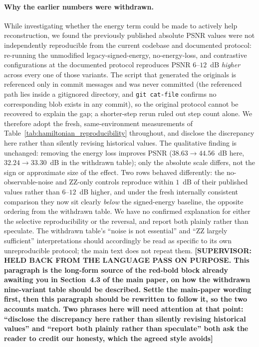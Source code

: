 \documentclass[11pt]{article}
\begin{document}
\paragraph{Why the earlier numbers were withdrawn.}\label{sec:hamiltonian_followup} While investigating whether the energy term could be made to actively help reconstruction, we found the previously published absolute PSNR values were not independently reproducible from the current codebase and documented protocol: re-running the unmodified legacy-signed-energy, no-energy-loss, and contrastive configurations at the documented protocol reproduces PSNR $6$--$12$~dB \emph{higher} across every one of those variants. The script that generated the originals is referenced only in commit messages and was never committed (the referenced path lies inside a gitignored directory, and \texttt{git cat-file} confirms no corresponding blob exists in any commit), so the original protocol cannot be recovered to explain the gap; a shorter-step rerun ruled out step count alone. We therefore adopt the fresh, same-environment measurements of Table~\ref{tab:hamiltonian_reproducibility} throughout, and disclose the discrepancy here rather than silently revising historical values. The qualitative finding is unchanged: removing the energy loss improves PSNR ($38.63\rightarrow44.56$~dB here, $32.24\rightarrow33.30$~dB in the withdrawn table); only the absolute scale differs, not the sign or approximate size of the effect. Two rows behaved differently: the no-observable-noise and ZZ-only controls reproduce within $1$~dB of their published values rather than $6$--$12$~dB higher, and under the fresh internally consistent comparison they now sit clearly \emph{below} the signed-energy baseline, the opposite ordering from the withdrawn table. We have no confirmed explanation for either the selective reproducibility or the reversal, and report both plainly rather than speculate. The withdrawn table's ``noise is not essential'' and ``ZZ largely sufficient'' interpretations should accordingly be read as specific to its own unreproducible protocol; the main text does not repeat them. {\color{red}\textbf{[SUPERVISOR: HELD BACK FROM THE LANGUAGE PASS ON PURPOSE. This paragraph is the long-form source of the red-bold block already awaiting you in Section~4.3 of the main paper, on how the withdrawn nine-variant table should be described. Settle the main-paper wording first, then this paragraph should be rewritten to follow it, so the two accounts match. Two phrases here will need attention at that point: ``disclose the discrepancy here rather than silently revising historical values'' and ``report both plainly rather than speculate'' both ask the reader to credit our honesty, which the agreed style avoids]}}
\end{document}
